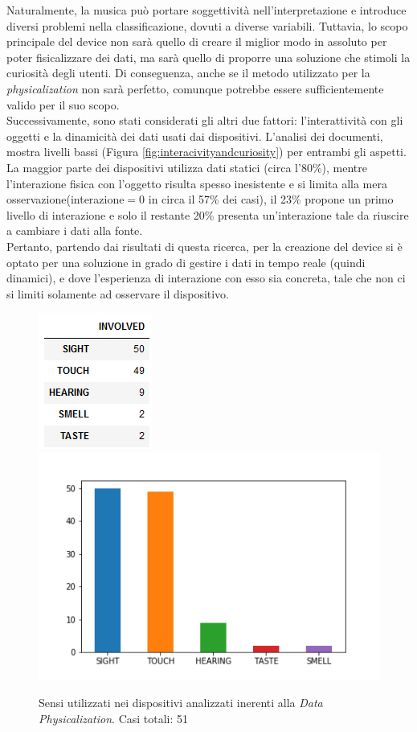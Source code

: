 \documentclass[12pt,a4paper]{report}
\begin{document}
Naturalmente, la musica può portare soggettività nell'interpretazione e introduce diversi problemi nella classificazione, dovuti a diverse variabili. Tuttavia, lo scopo principale del device non sarà quello di creare il miglior modo in assoluto per poter fisicalizzare dei dati, ma sarà quello di proporre una soluzione che stimoli la curiosità degli utenti. Di conseguenza, anche se il metodo utilizzato per la \textit{physicalization} non sarà perfetto, comunque potrebbe essere sufficientemente valido per il suo scopo.\\

Successivamente, sono stati considerati gli altri due fattori: l'interattività con gli oggetti e la dinamicità dei dati usati dai dispositivi. L'analisi dei documenti, mostra livelli bassi (Figura \ref{fig:interacivityandcuriosity}) per entrambi gli aspetti. La maggior parte dei dispositivi utilizza dati statici (circa l'80\%), mentre l'interazione fisica con l'oggetto risulta spesso inesistente e si limita alla mera osservazione(interazione$ = 0$ in circa il 57\% dei casi), il 23\% propone un primo livello di interazione e solo il restante 20\% presenta un'interazione tale da riuscire a cambiare i dati alla fonte. \\
Pertanto, partendo dai risultati di questa ricerca, per la creazione del device si è optato per una soluzione in grado di gestire i dati in tempo reale (quindi dinamici), e dove l'esperienza di interazione con esso sia concreta, tale che non ci si limiti solamente ad osservare il dispositivo.

\begin{figure}
	\begin{center}
		\includegraphics[scale=0.9]{Immagini/ENG_tableSenses.png}
		\includegraphics[scale=0.40]{Immagini/ENG_barplot_1.png}
		\caption{Sensi utilizzati nei dispositivi analizzati inerenti alla \textit{Data Physicalization}. Casi totali: 51}
		\label{fig:tablesenses}
	\end{center}
\end{figure}
\end{document}
